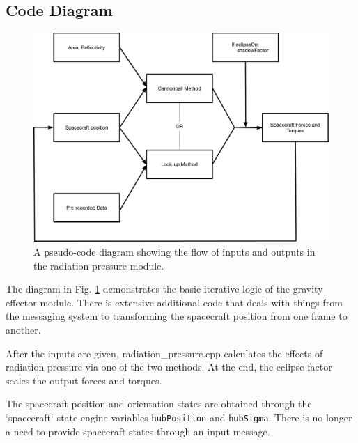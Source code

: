 \subsection{Code Diagram}

\begin{figure}[H]
	\centering \includegraphics[height=0.6\textwidth, keepaspectratio]{Figures/codeFlow.pdf}
	\caption{A pseudo-code diagram showing the flow of inputs and outputs in the radiation pressure module.}
	\label{img:codeFlow}
\end{figure}

The diagram in Fig. \ref{img:codeFlow} demonstrates the basic iterative logic of the gravity effector module. There is extensive additional code that deals with things from the messaging system to transforming the spacecraft position from one frame to another.

After the inputs are given, radiation\_pressure.cpp calculates the effects of radiation pressure via one of the two methods. At the end, the eclipse factor scales the output forces and torques.

The spacecraft position and orientation states are obtained through the `spacecraft` state engine variables {\tt hubPosition} and {\tt hubSigma}. There is no longer a need to provide spacecraft states through an input message.